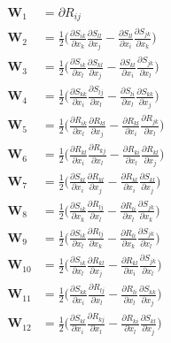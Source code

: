 %
\begin{subequations}
\begin{align}
	\label{E:37}
	\mathbf{W}_1  &= \partial R_{ij}  \\
	\mathbf{W}_2  &= \frac{1}{2} 
			  \bigg( \frac{\partial S_{ik}}{\partial x_k}
					 \frac{\partial S_{ll}}{\partial x_j} 
				  	- 
					 \frac{\partial S_{ll}}{\partial x_i} 
					 \frac{\partial S_{jk}}{\partial x_k} \bigg) \\	
	\mathbf{W}_3  &= \frac{1}{2} 
			  \bigg( \frac{\partial S_{ik}}{\partial x_l}
					 \frac{\partial S_{kl}}{\partial x_j} 
				    - 
					 \frac{\partial S_{kl}}{\partial x_i} 
					 \frac{\partial S_{jk}}{\partial x_l} \bigg) \\				 
	\mathbf{W}_4  &= \frac{1}{2} 
			  \bigg( \frac{\partial S_{kk}}{\partial x_i}
					 \frac{\partial S_{lj}}{\partial x_l} 
				  	- 
					 \frac{\partial S_{li}}{\partial x_l} 
					 \frac{\partial S_{kk}}{\partial x_j} \bigg) \\
	\mathbf{W}_5  &= \frac{1}{2} 
			  \bigg( \frac{\partial R_{ik}}{\partial x_l}
					 \frac{\partial R_{kl}}{\partial x_j} 
				  	- 
					 \frac{\partial R_{kl}}{\partial x_i} 
					 \frac{\partial R_{jk}}{\partial x_l} \bigg)  \\	
	\mathbf{W}_6  &= \frac{1}{2} 
			  \bigg( \frac{\partial R_{kl}}{\partial x_i}
					 \frac{\partial R_{kj}}{\partial x_l} 
				  	- 
					 \frac{\partial R_{ki}}{\partial x_l}
					 \frac{\partial R_{kl}}{\partial x_j}  \bigg)  \\
	\mathbf{W}_7  &= \frac{1}{2} 
			  \bigg( \frac{\partial S_{kl}}{\partial x_i}
					 \frac{\partial R_{kl}}{\partial x_j} 
				  	- 
					 \frac{\partial R_{kl}}{\partial x_i} 
					 \frac{\partial S_{kl}}{\partial x_j} \bigg)  \\
	\mathbf{W}_8  &= \frac{1}{2} 
			  \bigg( \frac{\partial S_{ik}}{\partial x_k}
					 \frac{\partial R_{lj}}{\partial x_l} 
				  	- 
					 \frac{\partial R_{li}}{\partial x_l} 
					 \frac{\partial S_{jk}}{\partial x_k} \bigg)  \\
	\mathbf{W}_9  &= \frac{1}{2} 
			  \bigg( \frac{\partial S_{ik}}{\partial x_l}
					 \frac{\partial R_{lj}}{\partial x_k} 
				  	- 
					 \frac{\partial R_{li}}{\partial x_k} 
					 \frac{\partial S_{jk}}{\partial x_l} \bigg)  \\
	\mathbf{W}_{10}  &= \frac{1}{2} 
			  \bigg( \frac{\partial S_{ik}}{\partial x_l}
					 \frac{\partial R_{kl}}{\partial x_j} 
				  	- 
					 \frac{\partial R_{kl}}{\partial x_i} 
					 \frac{\partial S_{jk}}{\partial x_l} \bigg)  \\	
	\mathbf{W}_{11}  &= \frac{1}{2} 
			  \bigg( \frac{\partial S_{kk}}{\partial x_i}
					 \frac{\partial R_{lj}}{\partial x_l} 
				  	- 
					 \frac{\partial R_{li}}{\partial x_l} 
					 \frac{\partial S_{kk}}{\partial x_j} \bigg)  \\
	\mathbf{W}_{12}  &= \frac{1}{2} 
			  \bigg( \frac{\partial S_{kl}}{\partial x_i}
					 \frac{\partial R_{kj}}{\partial x_l} 
				  	- 
					 \frac{\partial R_{ki}}{\partial x_l} 
					 \frac{\partial S_{kl}}{\partial x_j} \bigg)				 
\end{align}
\end{subequations}
%
%    


